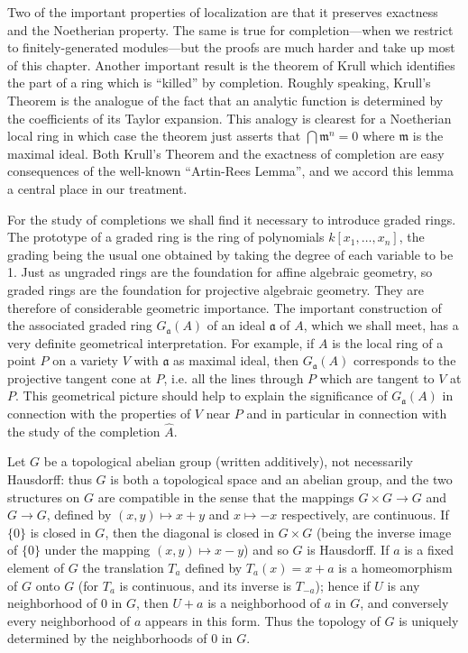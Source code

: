 Two of the important properties of localization are that it preserves exactness and the Noetherian property. The same is true for completion---when we restrict to finitely-generated modules---but the proofs are much harder and take up most of this chapter. Another important result is the theorem of Krull which identifies the part of a ring which is ``killed'' by completion. Roughly speaking, Krull's Theorem is the analogue of the fact that an analytic function is determined by the coefficients of its Taylor expansion. This analogy is clearest for a Noetherian local ring in which case the theorem just asserts that $\bigcap \mathfrak{m}^n = 0$ where $\mathfrak{m}$ is the maximal ideal. Both Krull's Theorem and the exactness of completion are easy consequences of the well-known ``Artin-Rees Lemma'', and we accord this lemma a central place in our treatment.

For the study of completions we shall find it necessary to introduce graded rings. The prototype of a graded ring is the ring of polynomials $k[x_1, \ldots, x_n]$, the grading being the usual one obtained by taking the degree of each variable to be 1. Just as ungraded rings are the foundation for affine algebraic geometry, so graded rings are the foundation for projective algebraic geometry. They are therefore of considerable geometric importance. The important construction of the associated graded ring $G_{\mathfrak{a}}(A)$ of an ideal $\mathfrak{a}$ of $A$, which we shall meet, has a very definite geometrical interpretation. For example, if $A$ is the local ring of a point $P$ on a variety $V$ with $\mathfrak{a}$ as maximal ideal, then $G_{\mathfrak{a}}(A)$ corresponds to the projective tangent cone at $P$, i.e. all the lines through $P$ which are tangent to $V$ at $P$. This geometrical picture should help to explain the significance of $G_{\mathfrak{a}}(A)$ in connection with the properties of $V$ near $P$ and in particular in connection with the study of the completion $\widehat{A}$.

Let $G$ be a topological abelian group (written additively), not necessarily Hausdorff: thus $G$ is both a topological space and an abelian group, and the two structures on $G$ are compatible in the sense that the mappings $G \times G \to G$ and $G \to G$, defined by $(x, y) \mapsto x + y$ and $x \mapsto -x$ respectively, are continuous. If $\{0\}$ is closed in $G$, then the diagonal is closed in $G \times G$ (being the inverse image of $\{0\}$ under the mapping $(x,y) \mapsto x - y$) and so $G$ is Hausdorff. If $a$ is a fixed element of $G$ the translation $T_a$ defined by $T_a(x) = x + a$ is a homeomorphism of $G$ onto $G$ (for $T_a$ is continuous, and its inverse is $T_{-a}$); hence if $U$ is any neighborhood of $0$ in $G$, then $U + a$ is a neighborhood of $a$ in $G$, and conversely every neighborhood of $a$ appears in this form. Thus the topology of $G$ is uniquely determined by the neighborhoods of $0$ in $G$.


